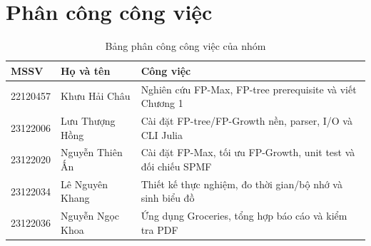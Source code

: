 \section{Phân công công việc}
\label{sec:job-distribution}

\begin{table}[H]
    \centering
    \caption{Bảng phân công công việc của nhóm}
    \begin{tabular}{l l p{7cm}}
        \toprule
        MSSV & Họ và tên & Công việc \\
        \midrule
        22120457 & Khưu Hải Châu    & Nghiên cứu FP-Max, FP-tree prerequisite và viết Chương 1 \\
        23122006 & Lưu Thượng Hồng  & Cài đặt FP-tree/FP-Growth nền, parser, I/O và CLI Julia \\
        23122020 & Nguyễn Thiên Ấn  & Cài đặt FP-Max, tối ưu FP-Growth, unit test và đối chiếu SPMF \\
        23122034 & Lê Nguyên Khang  & Thiết kế thực nghiệm, đo thời gian/bộ nhớ và sinh biểu đồ \\
        23122036 & Nguyễn Ngọc Khoa & Ứng dụng Groceries, tổng hợp báo cáo và kiểm tra PDF \\
        \bottomrule
    \end{tabular}
\end{table}

